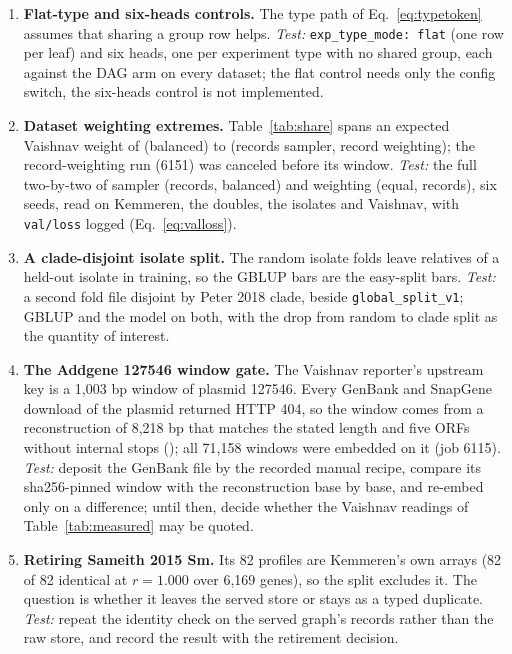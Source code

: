 \begin{enumerate}[leftmargin=*,itemsep=3pt]
\item \textbf{Flat-type and six-heads controls.} The type path of Eq.~\ref{eq:typetoken}
assumes that sharing a group row helps. \emph{Test:} \texttt{exp\_type\_mode: flat} (one row per
leaf) and six heads, one per experiment type with no shared group, each against the DAG arm
on every dataset; the flat control needs only the config switch, the six-heads control is
not implemented.

\item \textbf{Dataset weighting extremes.} Table~\ref{tab:share} spans an expected Vaishnav
weight of \tdBalancedWeight{} (balanced) to \tdVaishnavWeightRecords{} (records sampler, record
weighting); the record-weighting run (6151) was canceled before its window. \emph{Test:} the
full two-by-two of sampler (records, balanced) and weighting (equal, records), six seeds,
read on Kemmeren, the doubles, the isolates and Vaishnav, with \texttt{val/loss} logged
(Eq.~\ref{eq:valloss}).

\item \textbf{A clade-disjoint isolate split.} The random isolate folds leave relatives of a
held-out isolate in training, so the GBLUP bars are the easy-split bars. \emph{Test:} a second
fold file disjoint by Peter 2018 clade, beside \texttt{global\_split\_v1}; GBLUP and the model
on both, with the drop from random to clade split as the quantity of interest.

\item \textbf{The Addgene 127546 window gate.} The Vaishnav reporter's upstream key is a
1{,}003 bp window of plasmid 127546. Every GenBank and SnapGene download of the plasmid
returned HTTP 404, so the window comes from a reconstruction of 8{,}218 bp that matches the
stated length and five ORFs without internal stops ();
all 71{,}158 windows were embedded on it (job 6115). \emph{Test:} deposit the GenBank file by
the recorded manual recipe, compare its sha256-pinned window with the reconstruction base by
base, and re-embed only on a difference; until then, decide whether the Vaishnav readings of
Table~\ref{tab:measured} may be quoted.

\item \textbf{Retiring Sameith 2015 Sm.} Its 82 profiles are Kemmeren's own arrays (82 of 82
identical at $r = 1.000$ over 6{,}169 genes), so the split excludes it. The question is
whether it leaves the served store or stays as a typed duplicate. \emph{Test:} repeat the
identity check on the served graph's records rather than the raw store, and record the
result with the retirement decision.


\end{enumerate}
